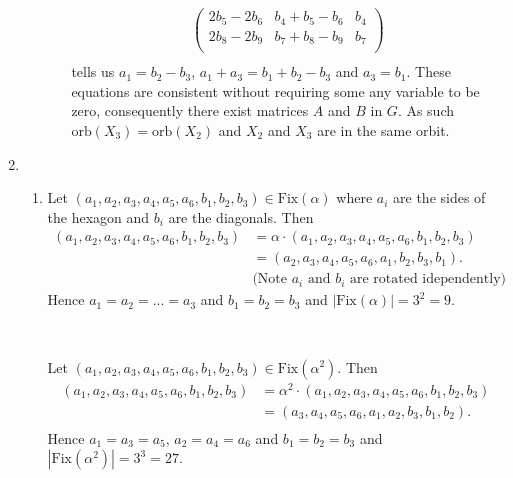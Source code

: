 \documentclass[10pt]{article}
\newcommand*{\Fix}{\text{Fix}}
\begin{document}
\begin{enumerate}
\begin{enumerate}
\begin{enumerate}
\begin{align*}
\begin{pmatrix}
            2b_5 - 2b_6 & b_4 + b_5 - b_6 & b_4 \\
            2b_8 - 2b_9 & b_7 + b_8 - b_9 & b_7 \\
            \end{pmatrix} \\
          \end{align*}
          tells us $a_1 = b_2 - b_3$, $a_1 + a_3 = b_1 + b_2 - b_3$ and $a_3 =
            b_1$. These equations are consistent without requiring some any
            variable to be zero, consequently there exist matrices $A$ and $B$
            in $G$. As such $\text{orb}(X_3) = \text{orb}(X_2)$ and $X_2$ and
            $X_3$ are in the same orbit.
          \end{enumerate}
      \end{enumerate}
    \item
        \begin{enumerate}
          \item Let $(a_1, a_2, a_3, a_4, a_5, a_6, b_1, b_2, b_3) \in
            \Fix(\alpha)$ where $a_i$ are the sides of the hexagon and $b_i$
            are the diagonals. Then 
            \begin{align*}
              (a_1, a_2, a_3, a_4, a_5, a_6, b_1, b_2, b_3) &= \alpha \cdot (a_1, a_2, a_3, a_4, a_5, a_6, b_1, b_2, b_3) \\
                                                            &= (a_2, a_3, a_4, a_5, a_6, a_1, b_2, b_3, b_1). \\
                                                            & \text{(Note $a_i$ and $b_i$ are rotated idependently)}
            \end{align*}
            Hence $a_1 = a_2 = ... = a_3$ and $b_1 = b_2 = b_3$ and $|\Fix(\alpha)| = 3^2 = 9$.

          \

          Let $(a_1, a_2, a_3, a_4, a_5, a_6, b_1, b_2, b_3) \in
            \Fix(\alpha^2)$. Then 
            \begin{align*}
              (a_1, a_2, a_3, a_4, a_5, a_6, b_1, b_2, b_3) &= \alpha^2 \cdot (a_1, a_2, a_3, a_4, a_5, a_6, b_1, b_2, b_3) \\
                                                            &= (a_3, a_4, a_5, a_6, a_1, a_2, b_3, b_1, b_2). \\
            \end{align*}
            Hence $a_1 = a_3 = a_5$, $a_2 = a_4 = a_6$ and $b_1 = b_2 = b_3$ and $|\Fix(\alpha^2)| = 3^3 = 27$.


\end{enumerate}
\end{enumerate}
\end{document}

